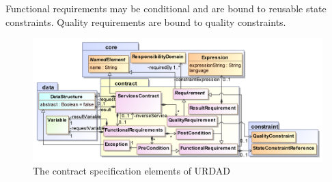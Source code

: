 Functional requirements may be conditional and are bound to reusable state constraints.  Quality requirements are bound to quality constraints.

\begin{figure}[Htbp]
  \centering
  \includegraphics{contract}
  \caption{The contract specification elements of URDAD}
  \label{fig:metamodel}
\end{figure}

